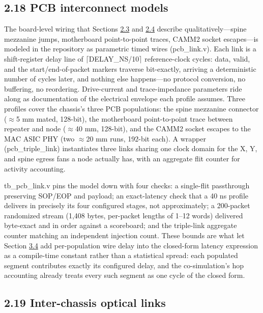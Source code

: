 \documentclass[12pt,onecolumn]{article}
\begin{document}
\subsection*{2.18 PCB interconnect models}\label{sec:2.18}

The board-level wiring that Sections \hyperref[sec:2.3]{2.3} and \hyperref[sec:2.4]{2.4} describe qualitatively---spine mezzanine jumps, motherboard point-to-point traces, CAMM2 socket escapes---is modeled in the repository as parametric timed wires (pcb\_link.v). Each link is a shift-register delay line of $\lceil$DELAY\_NS/10$\rceil$ reference-clock cycles: data, valid, and the start/end-of-packet markers traverse bit-exactly, arriving a deterministic number of cycles later, and nothing else happens---no protocol conversion, no buffering, no reordering. Drive-current and trace-impedance parameters ride along as documentation of the electrical envelope each profile assumes. Three profiles cover the chassis's three PCB populations: the spine mezzanine connector ($\approx$5 mm mated, 128-bit), the motherboard point-to-point trace between repeater and node ($\approx$40 mm, 128-bit), and the CAMM2 socket escapes to the MAC ASIC PHY (two $\approx$20 mm runs, 192-bit each). A wrapper (pcb\_triple\_link) instantiates three links sharing one clock domain for the X, Y, and spine egress fans a node actually has, with an aggregate flit counter for activity accounting.

tb\_pcb\_link.v pins the model down with four checks: a single-flit passthrough preserving SOP/EOP and payload; an exact-latency check that a 40 ns profile delivers in precisely its four configured stages, not approximately; a 200-packet randomized stream (1,408 bytes, per-packet lengths of 1--12 words) delivered byte-exact and in order against a scoreboard; and the triple-link aggregate counter matching an independent injection count. These bounds are what let Section \hyperref[sec:3.4]{3.4} add per-population wire delay into the closed-form latency expression as a compile-time constant rather than a statistical spread: each populated segment contributes exactly its configured delay, and the co-simulation's hop accounting already treats every such segment as one cycle of the closed form.

\subsection*{2.19 Inter-chassis optical links}\label{sec:2.19}
\end{document}
